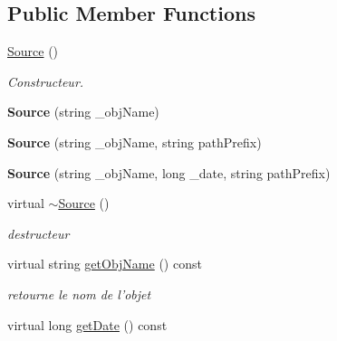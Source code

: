 \subsection*{Public Member Functions}
\begin{DoxyCompactItemize}
\item 
\hypertarget{classSource_a660c0a4b8b8f8402568bef86f2cb2fbb}{\hyperlink{classSource_a660c0a4b8b8f8402568bef86f2cb2fbb}{Source} ()}\label{classSource_a660c0a4b8b8f8402568bef86f2cb2fbb}

\begin{DoxyCompactList}\small\item\em Constructeur. \end{DoxyCompactList}\item 
\hypertarget{classSource_a446df9431f3636214dea4623cfe31c2b}{{\bfseries Source} (string \-\_\-obj\-Name)}\label{classSource_a446df9431f3636214dea4623cfe31c2b}

\item 
\hypertarget{classSource_ab16c58b57141f64da1fbdc76c70959aa}{{\bfseries Source} (string \-\_\-obj\-Name, string path\-Prefix)}\label{classSource_ab16c58b57141f64da1fbdc76c70959aa}

\item 
\hypertarget{classSource_a6d881583ac7e854493b3bebdeebb0255}{{\bfseries Source} (string \-\_\-obj\-Name, long \-\_\-date, string path\-Prefix)}\label{classSource_a6d881583ac7e854493b3bebdeebb0255}

\item 
\hypertarget{classSource_ac5104a4d66641ae529419b47da4a1473}{virtual \hyperlink{classSource_ac5104a4d66641ae529419b47da4a1473}{$\sim$\-Source} ()}\label{classSource_ac5104a4d66641ae529419b47da4a1473}

\begin{DoxyCompactList}\small\item\em destructeur \end{DoxyCompactList}\item 
\hypertarget{classSource_a5cfde2c99b9dae85f6c6fdd8b4bddb2e}{virtual string \hyperlink{classSource_a5cfde2c99b9dae85f6c6fdd8b4bddb2e}{get\-Obj\-Name} () const }\label{classSource_a5cfde2c99b9dae85f6c6fdd8b4bddb2e}

\begin{DoxyCompactList}\small\item\em retourne le nom de l'objet \end{DoxyCompactList}\item 
\hypertarget{classSource_a51690d970856cc094b271b640692ffef}{virtual long \hyperlink{classSource_a51690d970856cc094b271b640692ffef}{get\-Date} () const }\label{classSource_a51690d970856cc094b271b640692ffef}


\end{DoxyCompactItemize}
